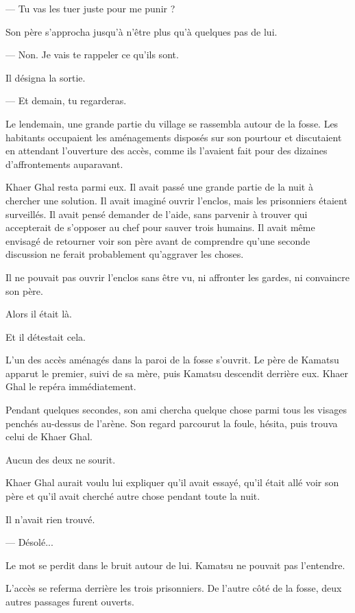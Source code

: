 — Tu vas les tuer juste pour me punir ?

Son père s'approcha jusqu'à n'être plus qu'à quelques pas de lui.

— Non. Je vais te rappeler ce qu'ils sont.

Il désigna la sortie.

— Et demain, tu regarderas.

\scenebreak

Le lendemain, une grande partie du village se rassembla autour de la fosse.
Les habitants occupaient les aménagements disposés sur son pourtour et
discutaient en attendant l'ouverture des accès, comme ils l'avaient fait pour
des dizaines d'affrontements auparavant.

Khaer Ghal resta parmi eux. Il avait passé une grande partie de la nuit à
chercher une solution. Il avait imaginé ouvrir l'enclos, mais les prisonniers
étaient surveillés. Il avait pensé demander de l'aide, sans parvenir à trouver
qui accepterait de s'opposer au chef pour sauver trois humains. Il avait même
envisagé de retourner voir son père avant de comprendre qu'une seconde
discussion ne ferait probablement qu'aggraver les choses.

Il ne pouvait pas ouvrir l'enclos sans être vu, ni affronter les gardes, ni
convaincre son père.

Alors il était là.

Et il détestait cela.

L'un des accès aménagés dans la paroi de la fosse s'ouvrit. Le père de Kamatsu
apparut le premier, suivi de sa mère, puis Kamatsu descendit derrière eux.
Khaer Ghal le repéra immédiatement.

Pendant quelques secondes, son ami chercha quelque chose parmi tous les visages
penchés au-dessus de l'arène. Son regard parcourut la foule, hésita, puis trouva
celui de Khaer Ghal.

Aucun des deux ne sourit.

Khaer Ghal aurait voulu lui expliquer qu'il avait essayé, qu'il était allé voir
son père et qu'il avait cherché autre chose pendant toute la nuit.

Il n'avait rien trouvé.

— Désolé...

Le mot se perdit dans le bruit autour de lui. Kamatsu ne pouvait pas
l'entendre.

L'accès se referma derrière les trois prisonniers. De l'autre côté de la fosse,
deux autres passages furent ouverts.

